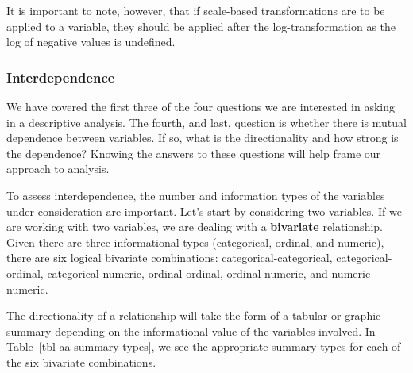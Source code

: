 \documentclass[
  letterpaper,
  DIV=11,
  numbers=noendperiod]{scrreport}
\theoremstyle{definition}
\theoremstyle{remark}
\begin{document}
It is important to note, however, that if scale-based transformations
are to be applied to a variable, they should be applied after the
log-transformation as the log of negative values is undefined.

\hypertarget{interdependence}{%
\subsubsection{Interdependence}\label{interdependence}}

We have covered the first three of the four questions we are interested
in asking in a descriptive analysis. The fourth, and last, question is
whether there is mutual dependence between variables. If so, what is the
directionality and how strong is the dependence? Knowing the answers to
these questions will help frame our approach to analysis.

To assess interdependence, the number and information types of the
variables under consideration are important. Let's start by considering
two variables. If we are working with two variables, we are dealing with
a \textbf{bivariate} relationship. Given there are three informational
types (categorical, ordinal, and numeric), there are six logical
bivariate combinations: categorical-categorical, categorical-ordinal,
categorical-numeric, ordinal-ordinal, ordinal-numeric, and
numeric-numeric.

The directionality of a relationship will take the form of a tabular or
graphic summary depending on the informational value of the variables
involved. In Table~\ref{tbl-aa-summary-types}, we see the appropriate
summary types for each of the six bivariate combinations.
\end{document}
